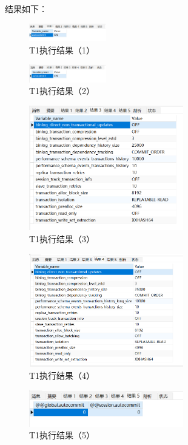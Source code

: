\documentclass{article}
\begin{document}
结果如下：

\begin{figure}[H]
  \centering
  \includegraphics[width=0.3\textwidth]{img/1.png}
  \caption{T1执行结果（1）}
\end{figure}

\begin{figure}[H]
  \centering
  \includegraphics[width=0.3\textwidth]{img/2.png}
  \caption{T1执行结果（2）}
\end{figure}

\begin{figure}[H]
  \centering
  \includegraphics[width=0.6\textwidth]{img/3.png}
  \caption{T1执行结果（3）}
\end{figure}

\begin{figure}[H]
  \centering
  \includegraphics[width=0.6\textwidth]{img/4.png}
  \caption{T1执行结果（4）}
\end{figure}

\begin{figure}[H]
  \centering
  \includegraphics[width=0.6\textwidth]{img/5.png}
  \caption{T1执行结果（5）}
\end{figure}
\end{document}
